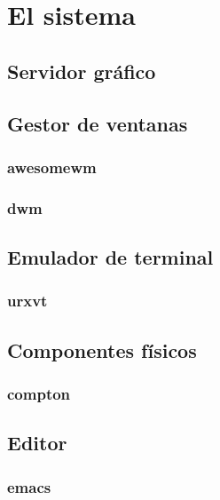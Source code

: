 \documentclass[a4paper, 11pt, titlepage]{book}
\begin{document}
    

\chapter{El sistema}

    \section{Servidor gráfico}

    \section{Gestor de ventanas}

        \subsection{awesomewm}

        \subsection{dwm}

    \section{Emulador de terminal}

        \subsection{urxvt}

    \section{Componentes físicos}

        \subsection{compton}

    \section{Editor}

        \subsection{emacs}
\end{document}
